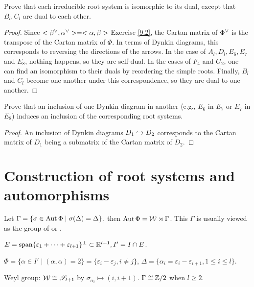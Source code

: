 \begin{ex}
  Prove that each irreducible root system is isomorphic to its dual, except that $B_l, C_l$ are dual to each other.
\end{ex}
\begin{proof}
  Since $<{\beta}^{\vee},{\alpha}^{\vee}> = <\alpha,\beta>$ Exercise \ref{9.2}, the Cartan matrix of ${\Phi}^{\vee}$ is the transpose of the Cartan matrix of $\Phi$. In terms of Dynkin diagrams, this corresponds to reversing the directions of the arrows. In the case of $A_l, D_l, E_6, E_7$ and $E_8$, nothing happens, so they are self-dual. In the cases of $F_4$ and $G_2$, one can find an isomorphism to their duals by reordering the simple roots. Finally, $B_l$ and $C_l$ become one another under this correspondence, so they are dual to one another.
\end{proof}

\begin{ex}\label{11.6}
  Prove that an inclusion of one Dynkin diagram in another (e.g., $E_6$ in $E_7$ or $E_7$ in $E_8$) induces an inclusion of the corresponding root systems.
\end{ex}
\begin{proof}
  An inclusion of Dynkin diagrams $D_1\hookrightarrow D_2$ corresponds to the Cartan matrix of $D_1$ being a submatrix of the Cartan matrix of $D_2$.
\end{proof}

\section{Construction of root systems and automorphisms}

\begin{defn}
  Let $\Gamma=\{\sigma\in\operatorname{Aut}\Phi\mid\sigma(\Delta)=\Delta\}$, then $\operatorname{Aut}\Phi={\cal W}\rtimes\Gamma$. This $\Gamma$ is usually viewed as the group of  or .
\end{defn}

\begin{exam}[$A_l(l\geqslant1)$]
  $E=\operatorname{span}\{\varepsilon_1+\cdots+\varepsilon_{l+1}\}^{\perp}\subset{\mathbb R}^{l+1}, I'=I\cap E$.

  $\Phi=\{\alpha\in I'\mid (\alpha,\alpha)=2\}=\{\varepsilon_i-\varepsilon_j, i\neq j\}$,
  $\Delta=\{\alpha_i=\varepsilon_i-\varepsilon_{i+1}, 1\leqslant i\leqslant l\}$.

  Weyl group: ${\cal W}\cong\mathscr{S}_{l+1}$ by $\sigma_{\alpha_i}\mapsto(i,i+1)$. $\Gamma\cong{\mathbb Z}/2$ when $l\geqslant2$.
\end{exam}


